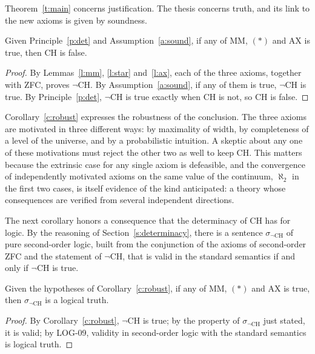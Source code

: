 \documentclass{situationist-preprint}
\begin{document}
Theorem~\ref{t:main} concerns justification. The thesis concerns truth, and its link to the new axioms is given by soundness.

\begin{corollary}\label{c:robust}
Given Principle~\ref{p:det} and Assumption~\ref{a:sound}, if any of MM, $(*)$ and AX is true, then CH is false.
\end{corollary}

\begin{proof}
By Lemmas~\ref{l:mm}, \ref{l:star} and~\ref{l:ax}, each of the three axioms, together with ZFC, proves $\neg$CH. By Assumption~\ref{a:sound}, if any of them is true, $\neg$CH is true. By Principle~\ref{p:det}, $\neg$CH is true exactly when CH is not, so CH is false.
\end{proof}

Corollary~\ref{c:robust} expresses the robustness of the conclusion. The three axioms are motivated in three different ways: by maximality of width, by completeness of a level of the universe, and by a probabilistic intuition. A skeptic about any one of these motivations must reject the other two as well to keep CH. This matters because the extrinsic case for any single axiom is defeasible, and the convergence of independently motivated axioms on the same value of the continuum, $\aleph_2$ in the first two cases, is itself evidence of the kind \citet{Godel1964} anticipated: a theory whose consequences are verified from several independent directions.

The next corollary honors a consequence that the determinacy of CH has for logic. By the reasoning of Section~\ref{s:determinacy}, there is a sentence $\sigma_{\neg\mathrm{CH}}$ of pure second-order logic, built from the conjunction of the axioms of second-order ZFC and the statement of $\neg$CH, that is valid in the standard semantics if and only if $\neg$CH is true.

\begin{corollary}\label{c:logical}
Given the hypotheses of Corollary~\ref{c:robust}, if any of MM, $(*)$ and AX is true, then $\sigma_{\neg\mathrm{CH}}$ is a logical truth.
\end{corollary}

\begin{proof}
By Corollary~\ref{c:robust}, $\neg$CH is true; by the property of $\sigma_{\neg\mathrm{CH}}$ just stated, it is valid; by LOG-09, validity in second-order logic with the standard semantics is logical truth.
\end{proof}
\end{document}
